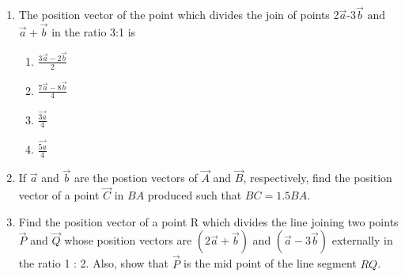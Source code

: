 \begin{enumerate}[label=\thesubsection.\arabic*,ref=\thesubsection.\theenumi]
\item The position vector of the point which divides the join of points 2$\vec{a}$-3$\vec{b}$ $\text{and}$ $\vec{a}+\vec{b}$ in the ratio 3:1 is
	\begin{enumerate}
\item $\frac{3\vec{a}-2\vec{b}}{2}$
\item $\frac{7\vec{a}-8\vec{b}}{4}$
\item $\frac{\vec{3a}}{4}$
\item $\frac{\vec{5a}}{4}$
\end{enumerate}
\item If $\vec{a}$ and $\vec{b}$ are the postion vectors of $\vec{A}$ and $\vec{B}$, respectively, find the position vector of a point $\vec{C}$ in $BA$ produced such that $BC=1.5BA$.
\item Find the position vector of a point R which divides the line joining two points $\vec{P}$ and $\vec{Q}$ whose position vectors are $(2\vec{a}+\vec{b})$ and $(\vec{a}-3\vec{b})$
externally in the ratio 1 : 2. Also, show that $\vec{P}$ is the mid point of the line segment $RQ$.
\end{enumerate}
